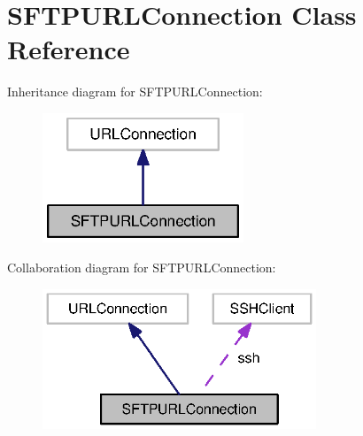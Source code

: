 \section{S\+F\+T\+P\+U\+R\+L\+Connection Class Reference}
\label{classorg_1_1smallfoot_1_1filexfer_1_1sftp_1_1SFTPURLConnection}


Inheritance diagram for S\+F\+T\+P\+U\+R\+L\+Connection\+:\nopagebreak
\begin{figure}[H]
\begin{center}
\leavevmode
\includegraphics[width=170pt]{classorg_1_1smallfoot_1_1filexfer_1_1sftp_1_1SFTPURLConnection__inherit__graph}
\end{center}
\end{figure}


Collaboration diagram for S\+F\+T\+P\+U\+R\+L\+Connection\+:\nopagebreak
\begin{figure}[H]
\begin{center}
\leavevmode
\includegraphics[width=232pt]{classorg_1_1smallfoot_1_1filexfer_1_1sftp_1_1SFTPURLConnection__coll__graph}
\end{center}
\end{figure}
